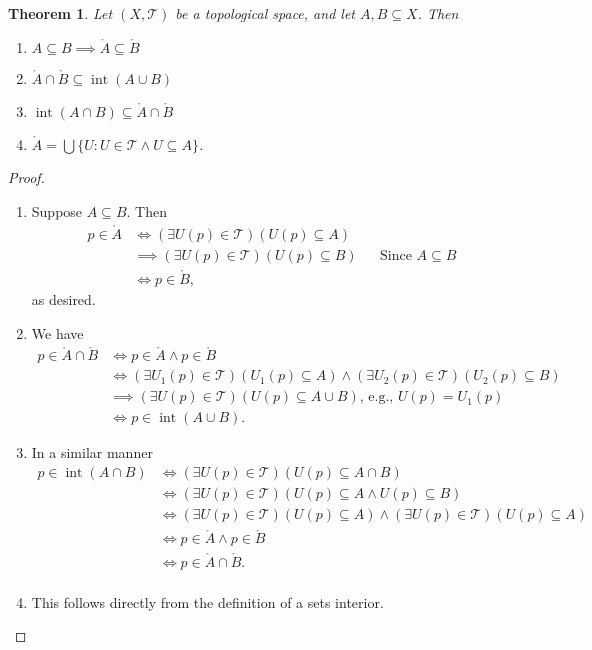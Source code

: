 \documentclass[10pt,a4paper]{article}
\author{Jeremiah Givens}
\theoremstyle{theorem}
\newtheorem{theorem}{Theorem}
\theoremstyle{definition}
\DeclareMathOperator{\interior}{int}
\newcommand{\Tau}{\mathcal{T}}
\begin{document}
\begin{theorem}
Let $(X, \Tau)$ be a topological space, and let $A,B \subseteq X$. Then 
\begin{enumerate}
\item $A \subseteq B \implies \mathring{A} \subseteq \mathring{B}$
\item $\mathring{A} \cap \mathring{B} \subseteq \interior(A \cup B)$
\item $\interior(A \cap B) \subseteq \mathring{A} \cap \mathring{B}$
\item $\mathring{A} = \bigcup \{U : U \in \Tau \land U \subseteq A \}$.
\end{enumerate}
\end{theorem}

\begin{proof}
\begin{enumerate}
\item Suppose $A \subseteq B$.  Then
\begin{align*}
p \in \mathring{A} &\iff (\exists U(p) \in \Tau)(U(p) \subseteq A)\\
&\implies(\exists U(p) \in \Tau)(U(p) \subseteq B) && \text{Since } A \subseteq B\\
&\iff p \in \mathring{B} \text{,}
\end{align*}
as desired.
\item We have 
\begin{align*}
p \in \mathring{A} \cap \mathring{B} &\iff p \in \mathring{A} \land p \in \mathring{B}\\
&\iff (\exists U_1(p) \in \Tau)(U_1(p) \subseteq A) \land (\exists U_2(p) \in \Tau)(U_2(p) \subseteq B)\\
&\implies (\exists U(p) \in \Tau)(U(p) \subseteq A \cup B) \text{,  e.g., } U(p) = U_1(p)\\
&\iff p \in \interior(A \cup B) \text{.}
\end{align*}
\item In a similar manner
\begin{align*}
p \in \interior(A \cap B) &\iff (\exists U(p) \in \Tau)(U(p) \subseteq A \cap B)\\
&\iff (\exists U(p) \in \Tau)(U(p) \subseteq A \land U(p) \subseteq B)\\
&\iff (\exists U(p) \in \Tau)(U(p) \subseteq A) \land (\exists U(p) \in \Tau)(U(p) \subseteq A)\\
&\iff p \in \mathring{A} \land p \in \mathring{B}\\
&\iff p \in \mathring{A} \cap \mathring{B}.\\
\end{align*}
\item This follows directly from the definition of a sets interior. 
\end{enumerate}
\end{proof}
\end{document}
